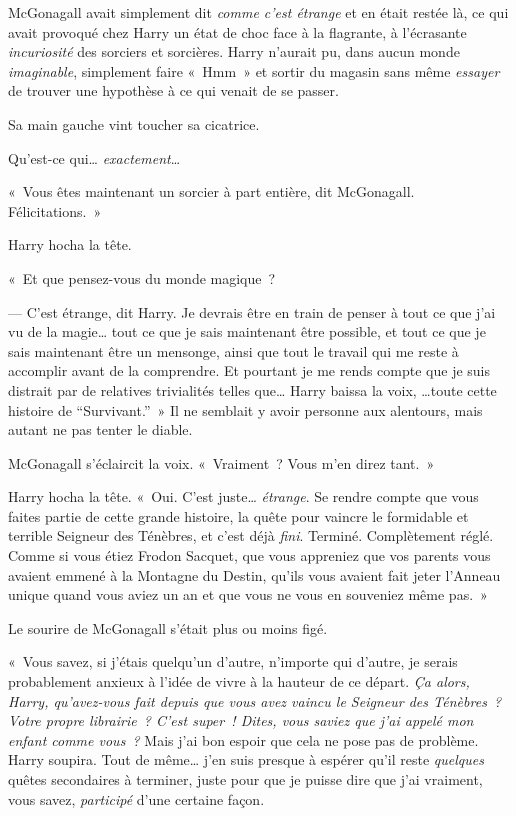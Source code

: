 McGonagall avait simplement dit \emph{comme c'est étrange} et en était restée là, ce qui avait provoqué chez Harry un état de choc face à la flagrante, à l'écrasante \emph{incuriosité} des sorciers et sorcières.
Harry n'aurait pu, dans aucun monde \emph{imaginable}, simplement faire «~Hmm~» et sortir du magasin sans même \emph{essayer} de trouver une hypothèse à ce qui venait de se passer.

Sa main gauche vint toucher sa cicatrice.

Qu'est-ce qui… \emph{exactement}…

«~Vous êtes maintenant un sorcier à part entière, dit McGonagall. Félicitations.~»

Harry hocha la tête.

«~Et que pensez-vous du monde magique~?

--- C'est étrange, dit Harry. Je devrais être en train de penser à tout ce que j'ai vu de la magie…
tout ce que je sais maintenant être possible, et tout ce que je sais maintenant être un mensonge, ainsi que tout le travail qui me reste à accomplir avant de la comprendre.
Et pourtant je me rends compte que je suis distrait par de relatives trivialités telles que… Harry baissa la voix, …toute cette histoire de “Survivant.”~»
Il ne semblait y avoir personne aux alentours, mais autant ne pas tenter le diable.

McGonagall s'éclaircit la voix. «~Vraiment~? Vous m'en direz tant.~»

Harry hocha la tête. «~Oui. C'est juste… \emph{étrange}.
Se rendre compte que vous faites partie de cette grande histoire, la quête pour vaincre le formidable et terrible Seigneur des Ténèbres, et c'est déjà \emph{fini}.
Terminé. Complètement réglé. Comme si vous étiez Frodon Sacquet, que vous appreniez que vos parents vous avaient emmené à la Montagne du Destin, qu'ils vous avaient fait jeter l'Anneau unique quand vous aviez un an et que vous ne vous en souveniez même pas.~»

Le sourire de McGonagall s'était plus ou moins figé.

«~Vous savez, si j'étais quelqu'un d'autre, n'importe qui d'autre, je serais probablement anxieux à l'idée de vivre à la hauteur de ce départ.
\emph{Ça alors, Harry, qu'avez-vous fait depuis que vous avez vaincu le Seigneur des Ténèbres~? Votre propre librairie~? C'est super~! Dites, vous saviez que j'ai appelé mon enfant comme vous~?}
Mais j'ai bon espoir que cela ne pose pas de problème.
Harry soupira.
Tout de même… j'en suis presque à espérer qu'il reste \emph{quelques} quêtes secondaires à terminer, juste pour que je puisse dire que j'ai vraiment, vous savez, \emph{participé} d'une certaine façon.

